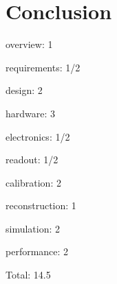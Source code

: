 \section{Conclusion}

overview: 1

requirements: 1/2

design: 2

hardware: 3

electronics: 1/2

readout: 1/2

calibration: 2

reconstruction: 1

simulation: 2

performance: 2

Total: 14.5


